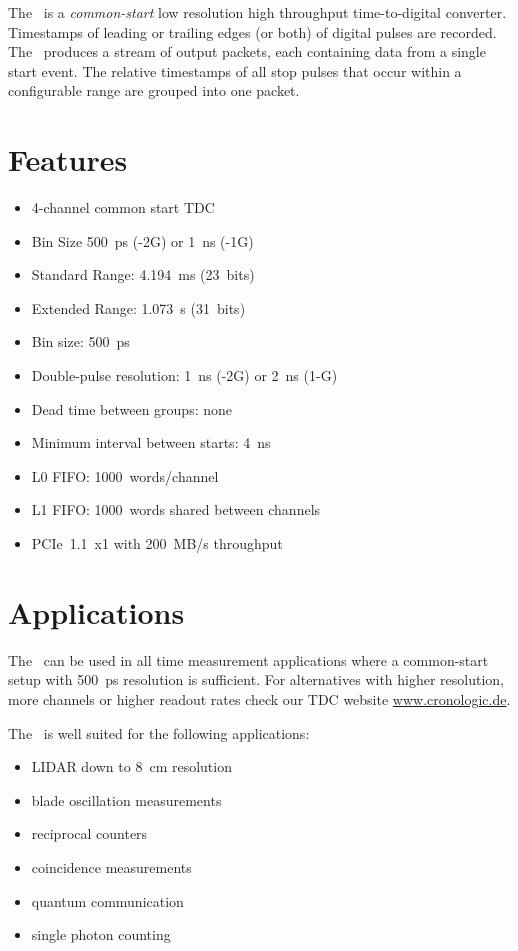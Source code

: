 The \deviceName\ is a \emph{common-start} low resolution high throughput time-to-digital converter. 
Timestamps of leading or trailing edges (or both) of digital pulses are recorded. 
The \deviceName\ produces a stream of output packets, each containing data from a single start event. 
The relative timestamps of all stop pulses that occur within a configurable range are grouped into one packet.

\section{Features}
	\begin{itemize}
		\item 4-channel common start TDC
		\item Bin Size 500~ps (-2G) or 1~ns (-1G)
		\item Standard Range: 4.194~ms (23~bits)
		\item Extended Range: 1.073~s (31~bits)
		\item Bin size: 500~ps
		\item Double-pulse resolution: 1~ns (-2G) or 2~ns (1-G)
		\item Dead time between groups: none
		\item Minimum interval between starts: 4~ns
		\item L0 FIFO: 1000~words/channel
		\item L1 FIFO: 1000~words shared between channels
		\item PCIe~1.1~x1 with 200~MB/s throughput
	\end{itemize} 

\section{Applications}
	The \deviceName\  can be used in all time measurement applications where a common-start setup with 500~ps resolution is sufficient. 
	For alternatives with higher resolution, more channels or higher readout rates check our TDC website \href{https://www.cronologic.de/produkte/products-overview#tdcdata}{www.cronologic.de}.

	The \deviceName\ is well suited for the following applications:
	\begin{itemize}
		\item LIDAR down to 8~cm resolution
		\item blade oscillation measurements
		\item reciprocal counters
		\item coincidence measurements
		\item quantum communication
		\item single photon counting
	\end{itemize} 
